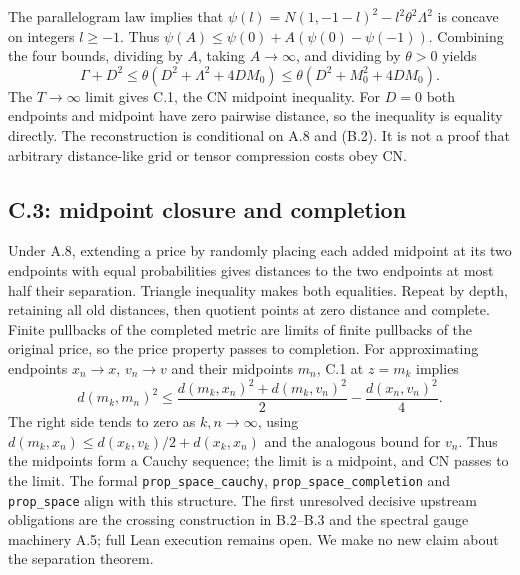 \documentclass[11pt,letterpaper]{article}
\begin{document}
The parallelogram law implies that $\psi(l)=N(1,-1-l)^2-l^2\theta^2\Lambda^2$ is concave on integers $l\ge-1$. Thus $\psi(A)\le\psi(0)+A(\psi(0)-\psi(-1))$. Combining the four bounds, dividing by $A$, taking $A\to\infty$, and dividing by $\theta>0$ yields
\[
\Gamma+D^2\le\theta(D^2+\Lambda^2+4DM_0)\le\theta(D^2+M_0^2+4DM_0).
\]
The $T\to\infty$ limit gives C.1, the CN midpoint inequality. For $D=0$ both endpoints and midpoint have zero pairwise distance, so the inequality is equality directly. The reconstruction is conditional on A.8 and (B.2). It is not a proof that arbitrary distance-like grid or tensor compression costs obey CN.

\subsection{C.3: midpoint closure and completion}
Under A.8, extending a price by randomly placing each added midpoint at its two endpoints with equal probabilities gives distances to the two endpoints at most half their separation. Triangle inequality makes both equalities. Repeat by depth, retaining all old distances, then quotient points at zero distance and complete. Finite pullbacks of the completed metric are limits of finite pullbacks of the original price, so the price property passes to completion. For approximating endpoints $x_n\to x$, $v_n\to v$ and their midpoints $m_n$, C.1 at $z=m_k$ implies
\[
 d(m_k,m_n)^2\le\frac{d(m_k,x_n)^2+d(m_k,v_n)^2}{2}-\frac{d(x_n,v_n)^2}{4}.
\]
The right side tends to zero as $k,n\to\infty$, using $d(m_k,x_n)\le d(x_k,v_k)/2+d(x_k,x_n)$ and the analogous bound for $v_n$. Thus the midpoints form a Cauchy sequence; the limit is a midpoint, and CN passes to the limit. The formal \texttt{prop\_space\_cauchy}, \texttt{prop\_space\_completion} and \texttt{prop\_space} align with this structure. The first unresolved decisive upstream obligations are the crossing construction in B.2--B.3 and the spectral gauge machinery A.5; full Lean execution remains open. We make no new claim about the separation theorem.
\end{document}

